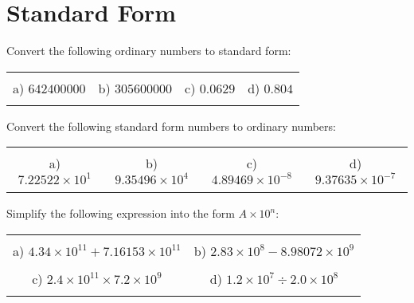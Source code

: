 \documentclass[12pt]{article}
\begin{document}
\section{Standard Form}
Convert the following ordinary numbers to standard form:
\begin{table}[h!]
\centering
\begin{tabular}{c c c c}
\hspace{2cm} & \hspace{5cm} & \hspace{5cm} & \hspace{4cm}\\
a) $642400000$ & b) $305600000$ & c) $0.0629$ & d) $0.804$\\ \\
\end{tabular}
\end{table}
\newline
Convert the following standard form numbers to ordinary numbers:
\begin{table}[h!]
\centering
\begin{tabular}{c c c c}
\hspace{2cm} & \hspace{5cm} & \hspace{5cm} & \hspace{4cm}\\
a) $7.22522\times10^1$ & b) $9.35496\times10^4$ & c) $4.89469\times10^{-8}$ & d) $9.37635\times10^{-7}$\\ \\
\end{tabular}
\end{table}
\newline
Simplify the following expression into the form $A\times10^n$:
\begin{table}[h!]
\centering
\begin{tabular}{c c}
\hspace{5cm} & \hspace{5cm}\\
a) $4.34\times10^{11} + 7.16153\times10^{11}$ & b) $2.83\times10^{8} - 8.98072\times10^{9}$\\ \\
c) $2.4\times10^{11}\times7.2\times10^{9}$ & d) $1.2\times10^{7}\div2.0\times10^{8}$\\ \\
\end{tabular}
\end{table}
\newline
\newpage
\end{document}
